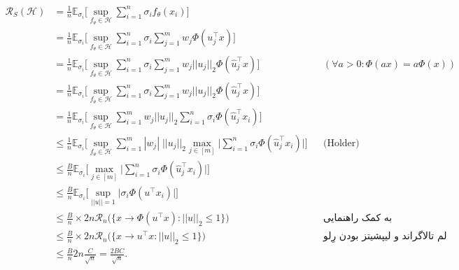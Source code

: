 \documentclass[]{article}
\newcommand{\cH}{\mathcal{H}}
\newcommand{\E}{\mathbb{E}}
\begin{document}
	
	\begin{align*}
	\mathcal{R}_S(\cH) &= \frac{1}{n}\E_{\sigma_i}\Bigg[\sup_{f_\theta \in \cH} \sum_{i = 1}^{n}\sigma_if_\theta(x_i)\Bigg]\\
	&=\frac{1}{n}\E_{\sigma_i}\Bigg[\sup_{f_\theta \in \cH} \sum_{i = 1}^{n}\sigma_i \sum_{j = 1}^{m} w_j \Phi(u_j^\top x)\Bigg]\\
	&=\frac{1}{n}\E_{\sigma_i}\Bigg[\sup_{f_\theta \in \cH} \sum_{i = 1}^{n}\sigma_i \sum_{j = 1}^{m} w_j ||u_j||_2\Phi(\hat u_j^\top x)\Bigg] && (\forall a > 0: \Phi(ax) = a \Phi(x))\\
	&=\frac{1}{n}\E_{\sigma_i}\Bigg[\sup_{f_\theta \in \cH} \sum_{i = 1}^{n}\sigma_i \sum_{j = 1}^{m} w_j ||u_j||_2\Phi(\hat u_j^\top x)\Bigg]\\
	&=\frac{1}{n}\E_{\sigma_i}\Bigg[\sup_{f_\theta \in \cH} \sum_{i = 1}^{m} w_j ||u_j||_2
	\sum_{i = 1}^{n}\sigma_i \Phi(\hat u_j^\top x_i)\Bigg]\\
	&\leq \frac{1}{n}\E_{\sigma_i}\Bigg[\sup_{f_\theta \in \cH} \sum_{i = 1}^{m} |w_j|\; ||u_j||_2
	\max_{j\in[m]}\Big|\sum_{i = 1}^{n}\sigma_i \Phi(\hat u_j^\top x_i)\Big|\Bigg]&&
	\text{
		(Holder)}
	\\
	&\leq \frac{B}{n}\E_{\sigma_i}\Bigg[
	\max_{j\in[m]}\Big|\sum_{i = 1}^{n}\sigma_i \Phi(\hat u_j^\top x_i)\Big|\Bigg]	\\
	&\leq \frac{B}{n}\E_{\sigma_i}\Bigg[
	\sup_{||u||=1}\Big|\sigma_i \Phi( u^\top x_i)\Big|\Bigg]	\\
	&\leq \frac{B}{n}\times 2n \mathcal{R}_n\Bigg(\{x\to\Phi(u^\top x): ||u||_2\leq 1\}\Bigg) && \text{به کمک راهنمایی}	\\
	&\leq \frac{B}{n}\times 2n \mathcal{R}_n\Bigg(\{x\to u^\top x: ||u||_2\leq 1\}\Bigg) && \text{لم تالاگراند و لیپشیتز بودن رِلو}	\\
	&\leq \frac{B}{n}2n \frac{C}{\sqrt{n}} = \frac{2BC}{\sqrt{n}}.
	\end{align*}
	
	
	
	
\end{document}
